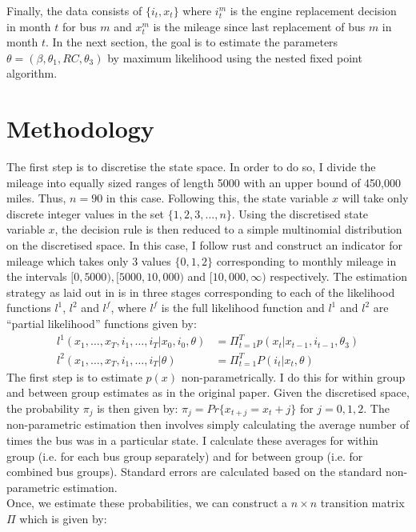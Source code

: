 \documentclass[11pt,letterpaper]{article}
\begin{document}
Finally, the data consists of $\{i_t, x_t\}$ where $i_t^m$ is the
engine replacement decision in month $t$ for bus $m$ and $x_t^m$ is
the mileage since last replacement of bus $m$ in month $t$. In the
next section, the goal is to estimate the parameters
$\theta = (\beta, \theta_1, RC, \theta_3)$ by maximum likelihood using
the nested fixed point algorithm.
\section{Methodology}
The first step is to discretise the state space. In order to do so, I
divide the mileage into equally sized ranges of length 5000 with an
upper bound of 450,000 miles. Thus, $n=90$ in this case. Following
this, the state variable $x$ will take only discrete integer values in
the set $\{1,2,3,\dots,n\}$. Using the discretised state variable $x$,
the decision rule is then reduced to a simple multinomial distribution
on the discretised space. In this case, I follow rust and construct
an indicator for mileage which takes only 3 values $\{0,1,2\}$
corresponding to monthly mileage in the intervals $[0,5000), [5000,
10,000)$ and $[10,000, \infty)$ respectively.  
The estimation strategy as laid out in \citet{rust1987optimal} is in
three stages corresponding to each of the likelihood functions $l^1$,
$l^2$ and $l^f$, where $l^f$ is the full likelihood function and $l^1$
and $l^2$ are ``partial likelihood'' functions given by:
\begin{align*}
  l^1(x_1, \dots, x_T, i_1, \dots, i_T | x_0, i_0, \theta) &=
                                                             \Pi_{t=1}^T p(x_t|x_{t-1},i_{t-1},\theta_3)\\
  l^2(x_1, \dots, x_T,i_1,\dots,i_T|\theta) &= \Pi_{t=1}^T P(i_t|x_t, \theta)
\end{align*}
The first step is to estimate $p(x)$ non-parametrically. I do this for
within group and between group estimates as in the original
paper. Given the discretised space, the probability $\pi_j$ is then
given by: $\pi_j = Pr\{x_{t+j}=x_t+j\}$ for $j=0,1,2$. The
non-parametric estimation then involves simply calculating the average
number of times the bus was in a particular state. I calculate these
averages for within group (i.e. for each bus group separately) and for
between group (i.e. for combined bus groups). Standard errors are
calculated based on the standard non-parametric estimation.\\
Once, we estimate these probabilities, we can construct a $n \times n$
transition matrix  $\Pi$ which is given by:
\end{document}
